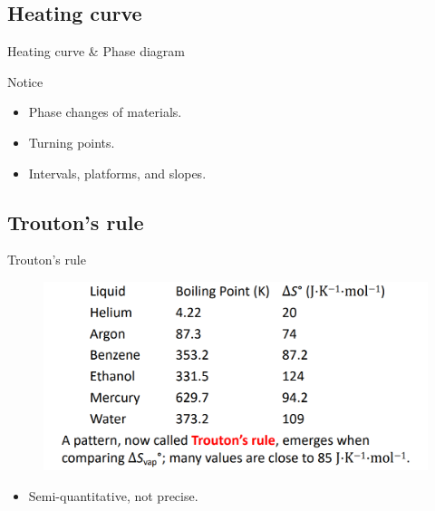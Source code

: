 \documentclass[12pt,compress]{beamer}
\begin{document}
\subsection{Heating curve}
\begin{frame}{Heating curve \& Phase diagram}
    \begin{block}{Notice}
        \begin{itemize}
            \item Phase changes of materials.
            \item Turning points.
            \item Intervals, platforms, and slopes.
        \end{itemize}
    \end{block}
\end{frame}

\subsection{Trouton’s rule}
\begin{frame}{Trouton's rule}
    \begin{figure}[H]
        \centering
        \includegraphics[width=\textwidth]{Trouton.png}
    \end{figure}
    \begin{itemize}
        \item Semi-quantitative, not precise.
    \end{itemize}
\end{frame}
\end{document}

